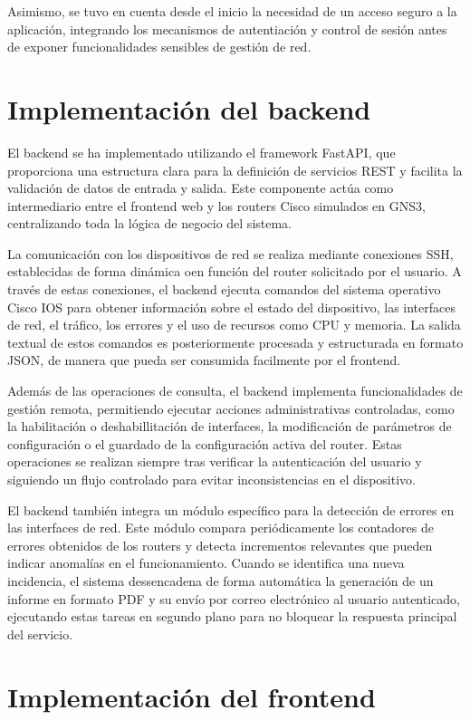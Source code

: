 Asimismo, se tuvo en cuenta desde el inicio la necesidad de un acceso seguro a la aplicación, integrando los mecanismos de autentiación y control de sesión antes de exponer funcionalidades sensibles de gestión de red.

\section{Implementación del backend}

El backend se ha implementado utilizando el framework FastAPI, que proporciona una estructura clara para la definición de servicios REST y facilita la validación de datos de entrada y salida. Este componente actúa como intermediario entre el frontend web y los routers Cisco simulados en GNS3, centralizando toda la lógica de negocio del sistema.

La comunicación con los dispositivos de red se realiza mediante conexiones SSH, establecidas de forma dinámica oen función del router solicitado por el usuario. A través de estas conexiones, el backend ejecuta comandos del sistema operativo Cisco IOS para obtener información sobre el estado del dispositivo, las interfaces de red, el tráfico, los errores y el uso de recursos como CPU y memoria. La salida textual de estos comandos es posteriormente procesada y estructurada en formato JSON, de manera que pueda ser consumida facilmente por el frontend.

Además de las operaciones de consulta, el backend implementa funcionalidades de gestión remota, permitiendo ejecutar acciones administrativas controladas, como la habilitación o deshabillitación de interfaces, la modificación de parámetros de configuración o el guardado de la configuración activa del router. Estas operaciones se realizan siempre tras verificar la autenticación del usuario y siguiendo un flujo controlado para evitar inconsistencias en el dispositivo.

El backend también integra un módulo específico para la detección de errores en las interfaces de red. Este módulo compara periódicamente los contadores de errores obtenidos de los routers y detecta incrementos relevantes que pueden indicar anomalías en el funcionamiento. Cuando se identifica una nueva incidencia, el sistema dessencadena de forma automática la generación de un informe en formato PDF y su envío por correo electrónico al usuario autenticado, ejecutando estas tareas en segundo plano para no bloquear la respuesta principal del servicio.

\section{Implementación del frontend}

